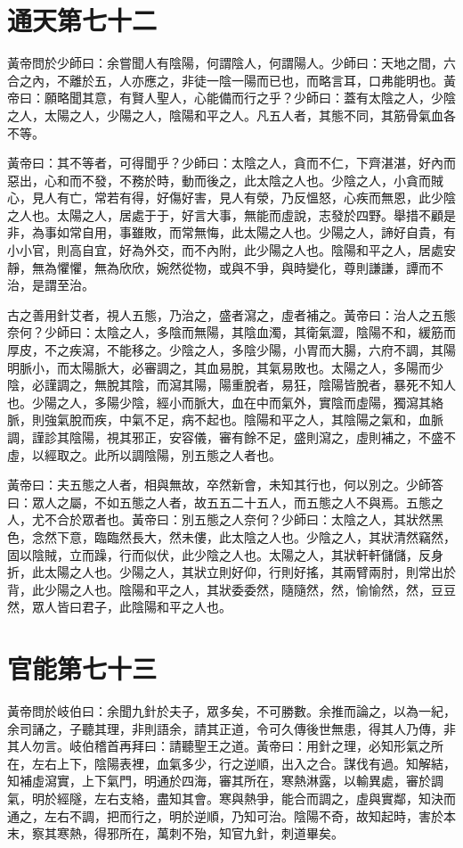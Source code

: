 \section{通天第七十二}

黃帝問於少師曰：余嘗聞人有陰陽，何謂陰人，何謂陽人。少師曰：天地之間，六合之內，不離於五，人亦應之，非徒一陰一陽而已也，而略言耳，口弗能明也。黃帝曰：願略聞其意，有賢人聖人，心能備而行之乎？少師曰：蓋有太陰之人，少陰之人，太陽之人，少陽之人，陰陽和平之人。凡五人者，其態不同，其筋骨氣血各不等。

黃帝曰：其不等者，可得聞乎？少師曰：太陰之人，貪而不仁，下齊湛湛，好內而惡出，心和而不發，不務於時，動而後之，此太陰之人也。少陰之人，小貪而賊心，見人有亡，常若有得，好傷好害，見人有滎，乃反慍怒，心疾而無恩，此少陰之人也。太陽之人，居處于于，好言大事，無能而虛說，志發於四野。舉措不顧是非，為事如常自用，事雖敗，而常無悔，此太陽之人也。少陽之人，諦好自貴，有小小官，則高自宜，好為外交，而不內附，此少陽之人也。陰陽和平之人，居處安靜，無為懼懼，無為欣欣，婉然從物，或與不爭，與時變化，尊則謙謙，譚而不治，是謂至治。

古之善用針艾者，視人五態，乃治之，盛者瀉之，虛者補之。黃帝曰：治人之五態奈何？少師曰：太陰之人，多陰而無陽，其陰血濁，其衛氣澀，陰陽不和，緩筋而厚皮，不之疾瀉，不能移之。少陰之人，多陰少陽，小胃而大腸，六府不調，其陽明脈小，而太陽脈大，必審調之，其血易脫，其氣易敗也。太陽之人，多陽而少陰，必謹調之，無脫其陰，而瀉其陽，陽重脫者，易狂，陰陽皆脫者，暴死不知人也。少陽之人，多陽少陰，經小而脈大，血在中而氣外，實陰而虛陽，獨瀉其絡脈，則強氣脫而疾，中氣不足，病不起也。陰陽和平之人，其陰陽之氣和，血脈調，謹診其陰陽，視其邪正，安容儀，審有餘不足，盛則瀉之，虛則補之，不盛不虛，以經取之。此所以調陰陽，別五態之人者也。

黃帝曰：夫五態之人者，相與無故，卒然新會，未知其行也，何以別之。少師答曰：眾人之屬，不如五態之人者，故五五二十五人，而五態之人不與焉。五態之人，尤不合於眾者也。黃帝曰：別五態之人奈何？少師曰：太陰之人，其狀然黑色，念然下意，臨臨然長大，然未僂，此太陰之人也。少陰之人，其狀清然竊然，固以陰賊，立而躁，行而似伏，此少陰之人也。太陽之人，其狀軒軒儲儲，反身折，此太陽之人也。少陽之人，其狀立則好仰，行則好搖，其兩臂兩肘，則常出於背，此少陽之人也。陰陽和平之人，其狀委委然，隨隨然，然，愉愉然，然，豆豆然，眾人皆曰君子，此陰陽和平之人也。

\section{官能第七十三}

黃帝問於岐伯曰：余聞九針於夫子，眾多矣，不可勝數。余推而論之，以為一紀，余司誦之，子聽其理，非則語余，請其正道，令可久傳後世無患，得其人乃傳，非其人勿言。岐伯稽首再拜曰：請聽聖王之道。黃帝曰：用針之理，必知形氣之所在，左右上下，陰陽表裡，血氣多少，行之逆順，出入之合。謀伐有過。知解結，知補虛瀉實，上下氣門，明通於四海，審其所在，寒熱淋露，以輸異處，審於調氣，明於經隧，左右支絡，盡知其會。寒與熱爭，能合而調之，虛與實鄰，知決而通之，左右不調，把而行之，明於逆順，乃知可治。陰陽不奇，故知起時，害於本末，察其寒熱，得邪所在，萬刺不殆，知官九針，刺道畢矣。

